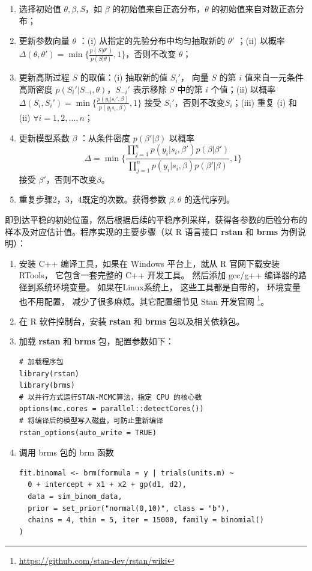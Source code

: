 \documentclass[12pt,a4paper,UTF8,twoside]{book}
\providecommand{\tightlist}{%
  \setlength{\itemsep}{0pt}\setlength{\parskip}{0pt}}
\theoremstyle{definition}
\theoremstyle{definition}
\theoremstyle{definition}
\theoremstyle{remark}
\begin{document}
\begin{enumerate}
\def\labelenumi{\arabic{enumi}.}
\tightlist
\item
  选择初始值 \(\theta,\beta,S\)，如 \(\beta\)
  的初始值来自正态分布，\(\theta\) 的初始值来自对数正态分布；
\item
  更新参数向量 \(\theta\) ：(i) 从指定的先验分布中均匀抽取新的
  \(\theta'\) ；(ii) 以概率
  \(\Delta(\theta,\theta') = \min \big\{\frac{p(S|\theta')}{p(S|\theta)},1\big\}\)，否则不改变
  \(\theta\)；
\item
  更新高斯过程 \(S\) 的取值：(i) 抽取新的值 \(S_{i}'\)， 向量 \(S\) 的第
  \(i\) 值来自一元条件高斯密度 \(p(S_{i}'|S_{-i},\theta)\)，\(S_{-i}'\)
  表示移除 \(S\) 中的第 \(i\) 个值；(ii) 以概率
  \(\Delta(S_{i},S_{i}') = \min\big\{ \frac{p(y_{i}|s_{i}',\beta)}{p(y_{i}s_{i},\beta)},1 \big\}\)
  接受 \(S_{i}'\)，否则不改变\(S_i\)；(iii) 重复 (i) 和 (ii)
  \(\forall i = 1,2,\ldots,n\)；
\item
  更新模型系数 \(\beta\) ：从条件密度 \(p(\beta'|\beta)\) 以概率
  \[\Delta = \min \big\{ \frac{\prod_{j=1}^{n}p(y_i|s_{i},\beta')p(\beta|\beta')}{\prod_{j=1}^{n}p(y_i|s_{i},\beta)p(\beta'|\beta)},1  \big\}\]
  接受 \(\beta'\)，否则不改变\(\beta\)。
\item
  重复步骤2，3，4既定的次数。获得参数 \(\beta,\theta\) 的迭代序列。
\end{enumerate}

即到达平稳的初始位置，然后根据后续的平稳序列采样，获得各参数的后验分布的样本及对应估计值。程序实现的主要步骤（以
R 语言接口 \textbf{rstan} 和 \textbf{brms} 为例说明）：

\begin{enumerate}
\def\labelenumi{\arabic{enumi}.}
\item
  安装 C++ 编译工具，如果在 Windows 平台上，就从 R 官网下载安装 RTools，
  它包含一套完整的 C++ 开发工具。 然后添加 gcc/g++
  编译器的路径到系统环境变量。 如果在Linux系统上， 这些工具都是自带的，
  环境变量也不用配置， 减少了很多麻烦。其它配置细节见 Stan 开发官网
  \footnote{\url{https://github.com/stan-dev/rstan/wiki}}。
\item
  在 R 软件控制台，安装 \textbf{rstan} 和 \textbf{brms}
  包以及相关依赖包。
\item
  加载 \textbf{rstan} 和 \textbf{brms} 包，配置参数如下：

\begin{verbatim}
# 加载程序包
library(rstan)
library(brms)
# 以并行方式运行STAN-MCMC算法，指定 CPU 的核心数
options(mc.cores = parallel::detectCores())
# 将编译后的模型写入磁盘，可防止重新编译
rstan_options(auto_write = TRUE)
\end{verbatim}
\item
  调用 brms 包的 brm 函数

\begin{verbatim}
fit.binomal <- brm(formula = y | trials(units.m) ~ 
  0 + intercept + x1 + x2 + gp(d1, d2), 
  data = sim_binom_data,
  prior = set_prior("normal(0,10)", class = "b"),
  chains = 4, thin = 5, iter = 15000, family = binomial()
)    
\end{verbatim}
\end{enumerate}
\end{document}
